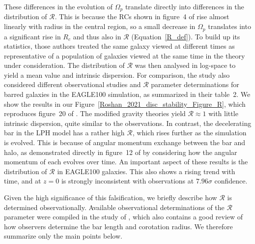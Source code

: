 \documentclass[fleqn,usenatbib,useAMS]{mnras} %
\begin{document}
These differences in the evolution of $\Omega_p$ translate directly into differences in the distribution of $\mathcal{R}$. This is because the RCs shown in figure~4 of \citet{Roshan_2021_disc_stability} rise almost linearly with radius in the central region, so a small decrease in $\Omega_p$ translates into a significant rise in $R_c$ and thus also in $\mathcal{R}$ (Equation~\ref{R_def}). To build up its statistics, those authors treated the same galaxy viewed at different times as representative of a population of galaxies viewed at the same time in the theory under consideration. The distribution of $\mathcal{R}$ was then analysed in log-space to yield a mean value and intrinsic dispersion. For comparison, the study also considered different observational studies and $\mathcal{R}$ parameter determinations for barred galaxies in the EAGLE100 simulation, as summarized in their table~2. We show the results in our Figure~\ref{Roshan_2021_disc_stability_Figure_R}, which reproduces figure~20 of \citet{Roshan_2021_disc_stability}. The modified gravity theories yield $\mathcal{R} \approx 1$ with little intrinsic dispersion, quite similar to the observations. In contrast, the decelerating bar in the LPH model has a rather high $\mathcal{R}$, which rises further as the simulation is evolved. This is because of angular momentum exchange between the bar and halo, as demonstrated directly in figure~12 of \citet{Roshan_2021_disc_stability} by considering how the angular momentum of each evolves over time. An important aspect of these results is the distribution of $\mathcal{R}$ in EAGLE100 galaxies. This also shows a rising trend with time, and at $z = 0$ is strongly inconsistent with observations at $7.96\sigma$ confidence.

Given the high significance of this falsification, we briefly describe how $\mathcal{R}$ is determined observationally. Available observational determinations of the $\mathcal{R}$ parameter were compiled in the study of \citet{Cuomo_2020}, which also contains a good review of how observers determine the bar length and corotation radius. We therefore summarize only the main points below.
\end{document}
